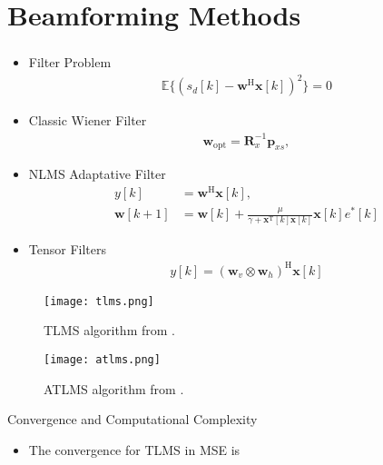\documentclass[10pt]{beamer}
\begin{document}
\section{Beamforming Methods}
\begin{frame}[allowframebreaks]
    \frametitle{\insertsection}
    \begin{itemize}
        \item Filter Problem 
            \begin{align}
                \mathbb{E}\{ (s_{d}[k] - \boldsymbol{w}^{\text{H}} \boldsymbol{x}[k] )^{2} \} = 0
            \end{align}
        \item Classic Wiener Filter
            \begin{align}
                \boldsymbol{w}_{\text{opt}} = \boldsymbol{R}^{-1}_{x} \boldsymbol{p}_{xs},   
            \end{align}
        \item NLMS Adaptative Filter
            \begin{align}
                y[k] &= \boldsymbol{w}^{\text{H}} \boldsymbol{x}[k], \\
                \boldsymbol{w}[k+1] &= \boldsymbol{w}[k] + \frac{\mu}{\gamma + \boldsymbol{x}^{\text{T}}[k] \boldsymbol{x}[k]} \boldsymbol{x}[k] e^{*}[k]
            \end{align}
        \item Tensor Filters
            \begin{align}
                y[k] = \left(\boldsymbol{w}_{v} \otimes \boldsymbol{w}_{h} \right)^{\text{H}} \boldsymbol{x}[k]
            \end{align}
    \end{itemize}
    \framebreak
    \begin{figure}
        \centering 
        \texttt{[image: tlms.png]}
        \caption{TLMS algorithm from \cite{ribeiroseparable}.}
        \label{fig:lms_alg} 
    \end{figure}
    \begin{figure}
        \centering
        \texttt{[image: atlms.png]}
        \caption{ATLMS algorithm from \cite{ribeiroseparable}.}
        \label{fig:atlms_alg} 
    \end{figure}
    \begin{block}{Convergence and Computational Complexity}
        \begin{itemize}
            \justifying
            \item The convergence for TLMS in MSE is
            

\end{itemize}
\end{block}
\end{frame}
\end{document}
